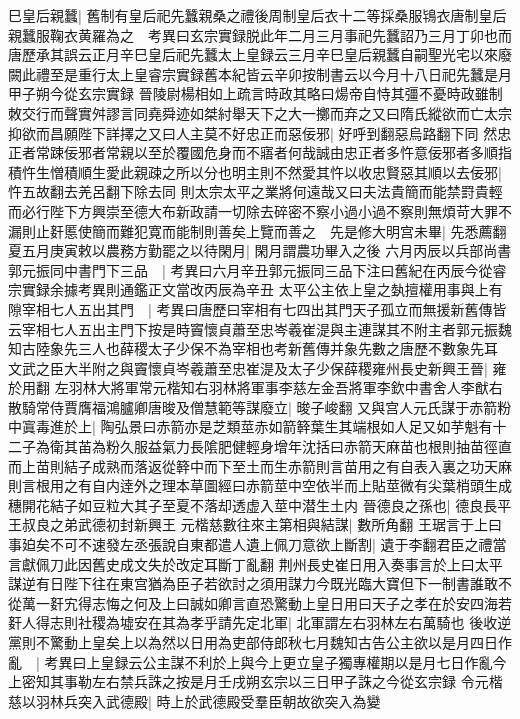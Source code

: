 巳皇后親蠶|{
	舊制有皇后祀先蠶親桑之禮後周制皇后衣十二等採桑服鴇衣唐制皇后親蠶服鞠衣黄羅為之　考異曰玄宗實録脱此年二月三月事祀先蠶詔乃三月丁卯也而唐歷承其誤云正月辛巳皇后祀先蠶太上皇録云三月辛巳皇后親蠶自嗣聖光宅以來廢闕此禮至是重行太上皇睿宗實録舊本紀皆云辛卯按制書云以今月十八日祀先蠶是月甲子朔今從玄宗實録}
晉陵尉楊相如上疏言時政其略曰煬帝自恃其彊不憂時政雖制敇交行而聲實舛謬言同堯舜迹如桀紂舉天下之大一擲而弃之又曰隋氏縱欲而亡太宗抑欲而昌願陛下詳擇之又曰人主莫不好忠正而惡佞邪|{
	好呼到翻惡烏路翻下同}
然忠正者常踈佞邪者常親以至於覆國危身而不寤者何哉誠由忠正者多忤意佞邪者多順指積忤生憎積順生愛此親疎之所以分也明主則不然愛其忤以收忠賢惡其順以去佞邪|{
	忤五故翻去羌呂翻下除去同}
則太宗太平之業將何遠哉又曰夫法貴簡而能禁罸貴輕而必行陛下方興崇至德大布新政請一切除去碎密不察小過小過不察則無煩苛大罪不漏則止姧慝使簡而難犯寛而能制則善矣上覽而善之　先是修大明宫未畢|{
	先悉薦翻}
夏五月庚寅敕以農務方勤罷之以待閑月|{
	閑月謂農功畢入之後}
六月丙辰以兵部尚書郭元振同中書門下三品　|{
	考異曰六月辛丑郭元振同三品下注曰舊紀在丙辰今從睿宗實録余據考異則通鑑正文當改丙辰為辛丑}
太平公主依上皇之埶擅權用事與上有隙宰相七人五出其門　|{
	考異曰唐歷曰宰相有七四出其門天子孤立而無援新舊傳皆云宰相七人五出主門下按是時竇懷貞蕭至忠岑羲崔湜與主連謀其不附主者郭元振魏知古陸象先三人也薛稷太子少保不為宰相也考新舊傳并象先數之唐歷不數象先耳}
文武之臣大半附之與竇懷貞岑羲蕭至忠崔湜及太子少保薛稷雍州長史新興王晉|{
	雍於用翻}
左羽林大將軍常元楷知右羽林將軍事李慈左金吾將軍李欽中書舍人李猷右散騎常侍賈膺福鴻臚卿唐晙及僧慧範等謀廢立|{
	晙子峻翻}
又與宫人元氏謀于赤箭粉中寘毒進於上|{
	陶弘景曰赤箭亦是芝類莖赤如箭簳葉生其端根如人足又如芋魁有十二子為衛其苖為粉久服益氣力長隂肥健輕身增年沈括曰赤箭天麻苗也根則抽苗徑直而上苗則結子成熟而落返從簳中而下至土而生赤箭則言苗用之有自表入裏之功天麻則言根用之有自内逹外之理本草圖經曰赤箭莖中空依半而上貼莖微有尖葉梢頭生成穗開花結子如豆粒大其子至夏不落却透虚入莖中潜生土内}
晉德良之孫也|{
	德良長平王叔良之弟武德初封新興王}
元楷慈數往來主第相與結謀|{
	數所角翻}
王琚言于上曰事廹矣不可不速發左丞張說自東都遣人遺上佩刀意欲上斷割|{
	遺于李翻君臣之禮當言獻佩刀此因舊史成文失於改定耳斷丁亂翻}
荆州長史崔日用入奏事言於上曰太平謀逆有日陛下往在東宫猶為臣子若欲討之須用謀力今既光臨大寶但下一制書誰敢不從萬一姧宄得志悔之何及上曰誠如卿言直恐驚動上皇日用曰天子之孝在於安四海若姧人得志則社稷為墟安在其為孝乎請先定北軍|{
	北軍謂左右羽林左右萬騎也}
後收逆黨則不驚動上皇矣上以為然以日用為吏部侍郎秋七月魏知古告公主欲以是月四日作亂　|{
	考異曰上皇録云公主謀不利於上與今上更立皇子獨專權期以是月七日作亂今上密知其事勒左右禁兵誅之按是月壬戌朔玄宗以三日甲子誅之今從玄宗録}
令元楷慈以羽林兵突入武德殿|{
	時上於武德殿受羣臣朝故欲突入為變}

